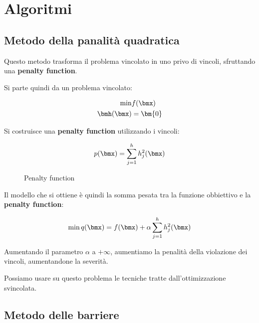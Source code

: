 \documentclass[\main/main.tex]{subfiles}
\begin{document}
\chapter{Algoritmi}
\section{Metodo della panalità quadratica}
Questo metodo trasforma il problema vincolato in uno privo di vincoli, sfruttando una \textbf{penalty function}.

Si parte quindi da un problema vincolato:

\begin{align*}
    \min &f(\bmx)\\
    \bmh(\bmx) &= \bm{0}
\end{align*}

Si costruisce una \textbf{penalty function} utilizzando i vincoli:

\begin{figure}
    \[
        p(\bmx) = \sum_{j=1}^h h_j^2(\bmx)
    \]
    \caption{Penalty function}
\end{figure}

Il modello che si ottiene è quindi la somma pesata tra la funzione obbiettivo e la \textbf{penalty function}:

\[
    \min q(\bmx) = f(\bmx) + \alpha\sum_{j=1}^h h_j^2(\bmx)
\]

Aumentando il parametro \(\alpha \) a \(+\infty \), aumentiamo la penalità della violazione dei vincoli, aumentandone la severità.

Possiamo usare su questo problema le tecniche tratte dall'ottimizzazione svincolata.

\section{Metodo delle barriere}
\end{document}
